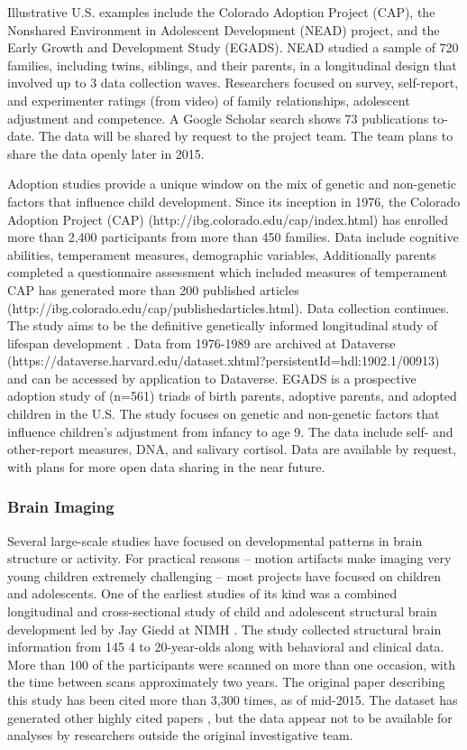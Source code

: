 \documentclass[letterpaper,man,apacite]{apa6}
\begin{document}
Illustrative U.S. examples include the Colorado Adoption Project (CAP), the Nonshared Environment in Adolescent Development (NEAD) project, and the Early Growth and Development Study (EGADS).
NEAD studied a sample of 720 families, including twins, siblings, and their parents, in a longitudinal design that involved up to 3 data collection waves.
Researchers focused on survey, self-report, and experimenter ratings (from video) of family relationships, adolescent adjustment and competence.
A Google Scholar search shows 73 publications to-date.
The data will be shared by request to the project team.
The team plans to share the data openly later in 2015.

Adoption studies provide a unique window on the mix of genetic and non-genetic factors that influence child development.
Since its inception in 1976, the Colorado Adoption Project (CAP) (http://ibg.colorado.edu/cap/index.html) has enrolled more than 2,400 participants from more than 450 families.
Data include cognitive abilities, temperament measures, demographic variables, 
Additionally parents completed a questionnaire assessment which included measures of temperament
CAP has generated more than 200 published articles (http://ibg.colorado.edu/cap/publishedarticles.html).
Data collection continues.
The study aims to be the definitive genetically informed longitudinal study of lifespan development \cite{rhea_colorado_2013}.
Data from 1976-1989 are archived at Dataverse (https://dataverse.harvard.edu/dataset.xhtml?persistentId=hdl:1902.1/00913) and can be accessed by application to Dataverse.
EGADS is a prospective adoption study of (n=561) triads of birth parents, adoptive parents, and adopted children in the U.S. 
The study focuses on genetic and non-genetic factors that influence children’s adjustment from infancy to age 9. 
The data include self- and other-report measures, DNA, and salivary cortisol.
Data are available by request, with plans for more open data sharing in the near future.

\subsubsection{Brain Imaging}

Several large-scale studies have focused on developmental patterns in brain structure or activity.
For practical reasons -- motion artifacts make imaging very young children extremely challenging -- most projects have focused on children and adolescents.
One of the earliest studies of its kind was a combined longitudinal and cross-sectional study of child and adolescent structural brain development led by Jay Giedd at NIMH \cite{giedd_brain_1999}.
The study collected structural brain information from 145 4 to 20-year-olds along with behavioral and clinical data.
More than 100 of the participants were scanned on more than one occasion, with the time between scans approximately two years.
The original paper describing this study has been cited more than 3,300 times, as of mid-2015.
The dataset has generated other highly cited papers \cite{gogtay_dynamic_2004}, but the data appear not to be available for analyses by researchers outside the original investigative team.
\end{document}
